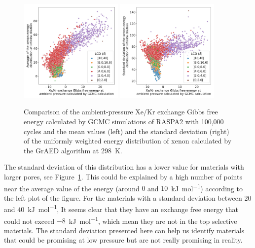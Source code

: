 \documentclass[main]{subfiles}
\begin{document}
\begin{figure}[ht]
  \centering
    \includegraphics[width=0.45\textwidth]{figures/3-fastsim/G_2080_vs_mean_grid_x_overview.jpg}
    \includegraphics[width=0.45\textwidth]{figures/3-fastsim/G_2080_vs_std_grid_x_overview.jpg}
    \caption{Comparison of the ambient-pressure Xe/Kr exchange Gibbs free energy calculated by GCMC simulations of RASPA2 with 100,000 cycles and the mean values (left) and the standard deviation (right) of the uniformly weighted energy distribution of xenon calculated by the GrAED algorithm at \SI{298}{\kelvin}.}\label{fgr:energy_dist_mean_std}
\end{figure}

The standard deviation of this distribution has a lower value for materials with larger pores, see Figure~\ref{fgr:energy_dist_mean_std}. This could be explained by a high number of points near the average value of the energy (around $0$ and $10$~\si{\kilo\joule\per\mole}) according to the left plot of the figure. For the materials with a standard deviation between $20$ and $40$~\si{\kilo\joule\per\mole}, It seems clear that they have an exchange free energy that could not exceed $-8$~\si{\kilo\joule\per\mole}, which mean they are not in the top selective materials. The standard deviation presented here can help us identify materials that could be promising at low pressure but are not really promising in reality. 
\end{document}
